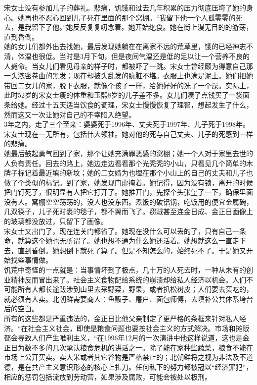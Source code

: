 \ifnum{}
	\begin{multicols}{\theparacolNo}
\fi
宋女士没有参加儿子的葬礼。悲痛，饥饿和过去几年积累的压力彻底压垮了她的身心。她再也不忍心回到儿子死在里面的那个窝棚。“我留下他一个人孤零零的死去，是我留下了他。”她反反复复叨念着。她开始绝食。她在街上漫无目的的游荡，直到昏倒。\\

她的女儿们都外出去找她，最后发现她躺在在离家不远的荒草里，饿的已经神志不清，体温也很低。当时是3月下旬，但是夜间气温还是低的足以让一个营养不良的人毙命。当女儿们看见母亲的样子时，都被吓了一跳。宋女士曾经颇为得意自己那一头浓密卷曲的黑发；现在却披头乱发的肮脏不堪。衣服上也满是泥土。她们把她带回二女儿的家，脱下衣服，就像个孩子一样，给她好好的洗了一个澡。实际上，此时52岁的宋女士瘦的体重和玉熙8岁的儿子差不多。女儿们凑了点钱买了一袋面条给她。经过十五天适当饮食的调理，宋女士慢慢恢复了理智，想起发生了什么，然而这又一次让她对自己的不幸陷入绝望。\\

3年之内，走了三个至亲：婆婆死于1996年、丈夫死于1997年、儿子死于1998年。宋女士现在一无所有，包括伟大领袖。她对他的死与自己丈夫、儿子的死感到一样的悲痛。\\

她最后鼓起勇气回到了家，那个让她充满罪恶感的窝棚；她一个人对于家里去世的人负有责任。回去的路上，她边走边看看那个光秃秃的小山，只看见几个简单的木牌子标记着最近填的新坟；她的二女婿为也埋在那个小山上的自己的丈夫和儿子也做了个类似的标记。到了家，她发现门虚掩着。她记得，因为没有锁，离开的时候把门钉死了，很明显有人把它打开了。她推开门，先探个头张望了一下，确保里面没有人。窝棚空空荡荡的，没人也没东西。煮饭的破铝锅，吃饭用的便宜金属碗，几双筷子，儿子死时裹的毯子，都不翼而飞了。窃贼甚至连金日成、金正日画像上的玻璃都没放过，只留下了画像。\\

宋女士又出门了，现在连关门都省了。她现在没什么可以丢的了，只有自己一条命，就算这个她也无所谓了。她也想不通为什么她还活着。她想就这么一直走下去，直到昏倒。她想倒下就死了算了。但是不知怎么的，始终死不了。于是她又开始找些事情做。\\

饥荒中奇怪的一点就是：当事情坏到了极点，几十万的人死去时，一种从未有的创业精神反而冒出来了。社会主义食物配给系统的崩溃却给私人经济以机会。人们不可能所有人都长途跋涉到山里去采野菜，野果，或者扒松树皮；人们要去买吃的，就必须有人卖。北朝鲜需要商人：鱼贩子、屠户、面包师傅，去填补公共体系垮台后的空白。\\

所有的这些都是严重违法的，金正日比他父亲制定了更严格的条框来针对私人经济。“在社会主义社会，即使是粮食问题也要按社会主义的方式解决。市场和摊贩都会导致人们产生唯利主义，“在1996年12月的一次演讲中他这样说道，这也是金正日为数不多的几次承认粮食危机的讲话之一。除了能在家种些蔬菜，粮食不能在市场上公开买卖。卖大米或者其它谷物是严格禁止的；北朝鲜将之视为非法及不道德，是在共产主义意识形态的核心上扎刀。任何私下的努力都被冠以“经济罪犯”，相应的惩罚包括流放到劳动营，如果涉及腐败，可能会被处以极刑。\\


\end{multicols}
